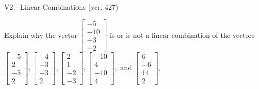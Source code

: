 \begin{exercise}
  \begin{exerciseTitle}V2 - Linear Combinations (ver. 427)\end{exerciseTitle}
  \begin{exerciseStatement}
    Explain why the vector \(\left[\begin{array}{c}
-5 \\
-10 \\
-3 \\
-2
\end{array}\right]\)  is or is not a linear 
	combination of the vectors \(\left[\begin{array}{c}
-5 \\
2 \\
-5 \\
2
\end{array}\right] , \left[\begin{array}{c}
-4 \\
-3 \\
-3 \\
2
\end{array}\right] , \left[\begin{array}{c}
2 \\
1 \\
-2 \\
-3
\end{array}\right] , \left[\begin{array}{c}
-10 \\
4 \\
-10 \\
4
\end{array}\right] , \text{ and } \left[\begin{array}{c}
6 \\
-6 \\
14 \\
2
\end{array}\right]\).
	



\end{exerciseStatement}
\end{exercise}
